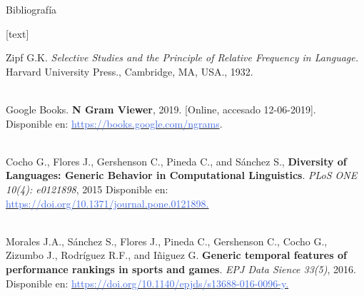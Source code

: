 \documentclass[10pt,xcolor={usenames,dvipsnames}]{beamer}
\begin{document}
\begin{frame}{Bibliografía}
	\label{bibliografia}
	\begin{thebibliography}{10}
		
		 Zipf G.K. \textit{Selective Studies and the Principle of Relative Frequency in Language.} Harvard University Press., Cambridge, MA, USA., 1932.
		
		\\
		
		 Google Books. \textbf{N Gram Viewer}, 2019. [Online, accesado 12-06-2019]. Disponible en: \href{https://books.google.com/ngrams}{\textcolor{RoyalBlue}{https://books.google.com/ngrams}}.
		
		\\
		 Cocho G., Flores J., Gershenson C., Pineda C., and Sánchez S., \textbf{Diversity of Languages: Generic Behavior in Computational Linguistics}. \textit{PLoS ONE 10(4): e0121898}, 2015
		Disponible en: \href{https://doi.org/10.1371/journal.pone.0121898}{\textcolor{RoyalBlue}{ https://doi.org/10.1371/journal.pone.0121898.}}
		
		\\
		
		 Morales J.A., Sánchez S., Flores J., Pineda C., Gershenson C., Cocho G., Zizumbo J., Rodríguez R.F., and Iñiguez G. 
		\textbf{Generic temporal features of performance rankings in sports and games}. \textit{EPJ Data Sience 33(5)}, 2016. Disponible en: \href{https://doi.org/10.1140/epjds/s13688-016-0096-y}{\textcolor{RoyalBlue}{https://doi.org/10.1140/epjds/s13688-016-0096-y.}} 

	\end{thebibliography}
\end{frame}


\end{document}

